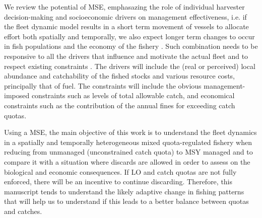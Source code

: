 \documentclass[12pt,oneline,a4paper,numbib]{ouparticle}
\numberwithin{equation}{subsection} %
\begin{document}
We review the potential of MSE, emphasazing the role of individual harvester decision-making and socioeconomic drivers on management effectiveness, i.e. if the fleet dynamic model results in a short term movement of vessels to allocate effort both spatially and temporally, we also expect longer term changes to occur in fish populations and the economy of the fishery \cite{Alzorriz2018}. Such combination needs to be responsive to all the drivers that influence and motivate the actual fleet and to respect existing constraints \cite{Venables2009}. The drivers will include the (real or perceived) local abundance and catchability of the fished stocks and various resource costs, principally that of fuel. The constraints will include the obvious management-imposed constraints such as levels of total allowable catch, and economical constraints such as the contribution of the annual fines for exceeding catch quotas.

Using a MSE, the main objective of this work is to understand the fleet dynamics in a spatially and temporally heterogeneous mixed quota-regulated fishery when reducing from unmanaged (unconstrained catch quota) to MSY managed and to compare it with a situation where discards are allowed in order to assess on the biological and economic consequences. If LO and catch quotas are not fully enforced, there will be an incentive to continue discarding. Therefore, this manuscript tends to understand the likely adaptive change in fishing patterns that will help us to understand if this leads to a better balance between quotas and catches.

\end{document}
